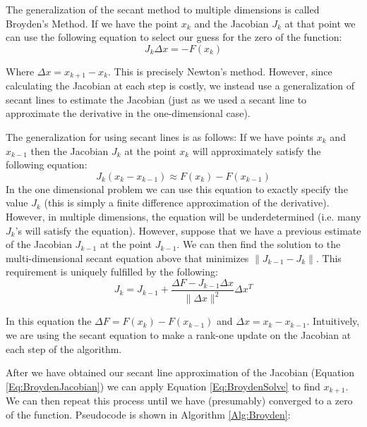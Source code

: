 The generalization of the secant method to multiple dimensions is called Broyden's Method.  If we have the point $x_k$ and the Jacobian $J_k$ at that point we can use the following equation to select our guess for the zero of the function:
\begin{equation} \label{Eq:BroydenSolve}
J_k \Delta x = -F(x_k)
\end{equation}

Where $\Delta x = x_{k+1}-x_k$. This is precisely Newton's method. However, since calculating the Jacobian at each step is costly, we instead use a generalization of secant lines to estimate the Jacobian (just as we used a secant line to approximate the derivative in the one-dimensional case).

The generalization for using secant lines is as follows: If we have points $x_k$ and $x_{k-1}$ then the Jacobian $J_k$ at the point $x_k$ will approximately satisfy the following equation:
\begin{equation}
J_k (x_k-x_{k-1}) \approx F(x_k) - F(x_{k-1})
\end{equation}
In the one dimensional problem we can use this equation to exactly specify the value $J_k$ (this is simply a finite difference approximation of the derivative). However, in multiple dimensions, the equation will be underdetermined (i.e. many $J_k$'s will satisfy the equation). However, suppose that we have a previous estimate of the Jacobian $J_{k-1}$ at the point $J_{k-1}$. We can then find the solution to the multi-dimensional secant equation above that minimizes $\|J_{k-1}-J_k\|$. This requirement is uniquely fulfilled by the following:
\begin{equation} \label{Eq:BroydenJacobian}
J_k = J_{k-1} + \frac{\Delta F-J_{k-1} \Delta x}{\|\Delta x\|^2}\Delta x^T
\end{equation}

In this equation the $\Delta F = F(x_k)-F(x_{k-1})$ and $\Delta x = x_k-x_{k-1}$. Intuitively, we are using the secant equation to make a rank-one update on the Jacobian at each step of the algorithm.

After we have obtained our secant line approximation of the Jacobian (Equation \ref{Eq:BroydenJacobian}) we can apply Equation \ref{Eq:BroydenSolve} to find $x_{k+1}$. We can then repeat this process until we have (presumably) converged to a zero of the function. Pseudocode is shown in Algorithm \ref{Alg:Broyden}:

